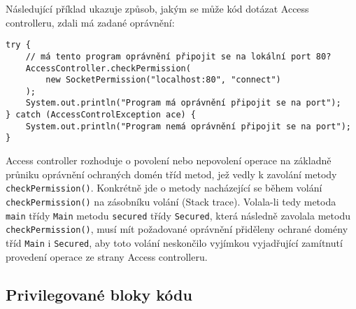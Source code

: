 Následující příklad ukazuje způsob, jakým se může kód dotázat Access controlleru, zdali má zadané oprávnění: \cite[5.5]{oaks}

\begin{verbatim}
try {
    // má tento program oprávnění připojit se na lokální port 80?
    AccessController.checkPermission(
        new SocketPermission("localhost:80", "connect")
    );
    System.out.println("Program má oprávnění připojit se na port");
} catch (AccessControlException ace) {
    System.out.println("Program nemá oprávnění připojit se na port");
}
\end{verbatim}

Access controller rozhoduje o povolení nebo nepovolení operace na základně průniku oprávnění ochraných domén tříd metod, jež vedly k zavolání metody {\tt checkPermission()}. Konkrétně jde o metody nacházející se během volání {\tt checkPermission()} na zásobníku volání (Stack trace). Volala-li tedy metoda {\tt main} třídy {\tt Main} metodu {\tt secured} třídy {\tt Secured}, která následně zavolala metodu {\tt checkPermission()}, musí mít požadované oprávnění přiděleny ochrané domény tříd {\tt Main} i {\tt Secured}, aby toto volání neskončilo vyjímkou vyjadřující zamítnutí provedení operace ze strany Access controlleru. \cite[5.5]{oaks}\cite[6.1]{oaks}


%

\subsection{Privilegované bloky kódu}\label{privilegovaneBloky}


